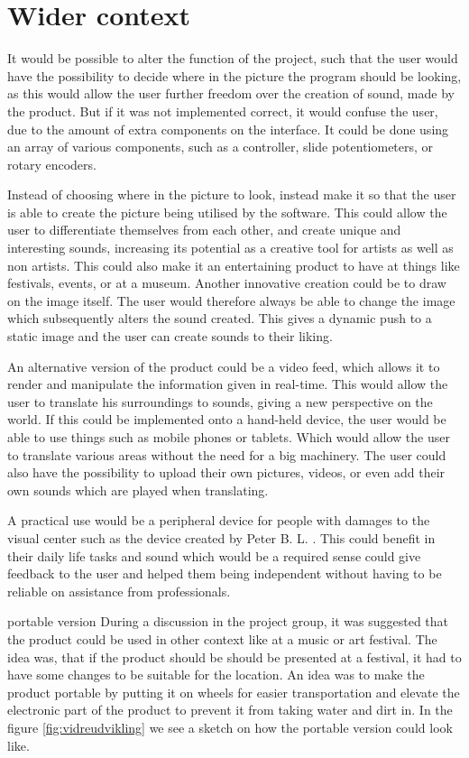 
\section{Wider context}

It would be possible to alter the function of the project, such that the user would have the possibility to decide where in the picture the program should be looking, as this would allow the user further freedom over the creation of sound, made by the product. But if it was not implemented correct, it would confuse the user, due to the amount of extra components on the interface. It could be done using an array of various components, such as a controller, slide potentiometers, or rotary encoders. 

Instead of choosing where in the picture to look, instead make it so that the user is able to create the picture being utilised by the software. This could allow the user to differentiate themselves from each other, and create unique and interesting sounds, increasing its potential as a creative tool for artists as well as non artists. This could also make it an entertaining product to have at things like festivals, events, or at a museum. Another innovative creation could be to draw on the image itself. The user would therefore always be able to change the image which subsequently alters the sound created. This gives a dynamic push to a static image and the user can create sounds to their liking.  

An alternative version of the product could be a video feed, which allows it to render and manipulate the information given in real-time. This would allow the user to translate his surroundings to sounds, giving a new perspective on the world. If this could be implemented onto a hand-held device, the user would be able to use things such as mobile phones or tablets. Which would allow the user to translate various areas without the need for a big machinery. The user could also have the possibility to upload their own pictures, videos, or even add their own sounds which are played when translating. 

A practical use would be a peripheral device for people with damages to the visual center such as the device created by Peter B. L. \cite{Meijer1992}. This could benefit in their daily life tasks and sound which would be a required sense could give feedback to the user and helped them being independent without having to be reliable on assistance from professionals.   

portable version
During a discussion in the project group, it was suggested that the product could be used in other context like at a music or art festival. The idea was, that if the product should be should be presented at a festival, it had to have some changes to be suitable for the location. An idea was to make the product portable by putting it on wheels for easier transportation and elevate the electronic part of the product to prevent it from taking water and dirt in. In the figure \ref{fig:vidreudvikling} we see a sketch on how the portable version could look like. 

